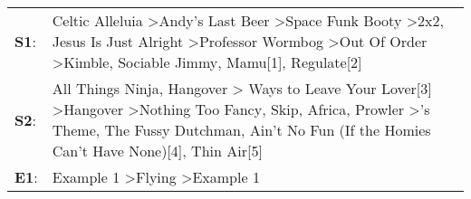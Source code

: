 \begin{supertabular}{p{0.03\textwidth}p{0.92\textwidth}}
 \textbf{S1}:  &                                                   Celtic Alleluia\textsuperscript{} \textgreater \enspace Andy's Last Beer\textsuperscript{} \textgreater \enspace Space Funk Booty\textsuperscript{} \textgreater \enspace 2x2\textsuperscript{}, \enspace Jesus Is Just Alright\textsuperscript{} \textgreater \enspace Professor Wormbog\textsuperscript{} \textgreater \enspace Out Of Order\textsuperscript{} \textgreater \enspace Kimble\textsuperscript{}, \enspace Sociable Jimmy\textsuperscript{}, \enspace Mamu[1]\textsuperscript{}, \enspace Regulate[2]\textsuperscript{}  \enspace  \\
 \textbf{S2}:  &  All Things Ninja\textsuperscript{}, \enspace Hangover\textsuperscript{} \textgreater {} Ways to Leave Your Lover[3]\textsuperscript{} \textgreater \enspace Hangover\textsuperscript{} \textgreater \enspace Nothing Too Fancy\textsuperscript{}, \enspace Skip\textsuperscript{}, \enspace Africa\textsuperscript{}, \enspace Prowler\textsuperscript{} \textgreater {}'s Theme\textsuperscript{}, \enspace The Fussy Dutchman\textsuperscript{}, \enspace Ain't No Fun (If the Homies Can't Have None)[4]\textsuperscript{}, \enspace Thin Air[5]\textsuperscript{}  \enspace  \\
 \textbf{E1}:  &                                                                                                                                                                                                                                                                                                                                                                                                                                                             Example 1\textsuperscript{} \textgreater \enspace Flying\textsuperscript{} \textgreater \enspace Example 1\textsuperscript{}  \enspace  \\
\end{supertabular}
